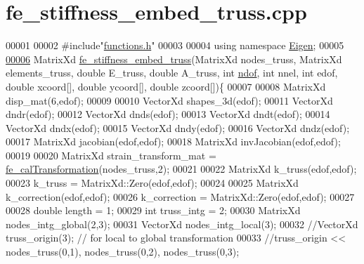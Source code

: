 \hypertarget{fe__stiffness__embed__truss_8cpp_source}{}\section{fe\+\_\+stiffness\+\_\+embed\+\_\+truss.\+cpp}
\label{fe__stiffness__embed__truss_8cpp_source}

\begin{DoxyCode}
00001 
00002 \textcolor{preprocessor}{#include"\hyperlink{functions_8h}{functions.h}"}
00003 
00004 \textcolor{keyword}{using namespace }\hyperlink{namespace_eigen}{Eigen};
00005 
\hyperlink{fe__stiffness__embed__truss_8cpp_ab3798340a27f0972299b3820aab0ccba}{00006} MatrixXd \hyperlink{fe__stiffness__embed__truss_8cpp_ab3798340a27f0972299b3820aab0ccba}{fe\_stiffness\_embed\_truss}(MatrixXd nodes\_truss, MatrixXd elements\_truss, \textcolor{keywordtype}{
      double} E\_truss, \textcolor{keywordtype}{double} A\_truss, \textcolor{keywordtype}{int} \hyperlink{_global_variables_8h_aa789fe4d8a13fd0990b630909430d5d0}{ndof}, \textcolor{keywordtype}{int} nnel, \textcolor{keywordtype}{int} edof, \textcolor{keywordtype}{double} xcoord[], \textcolor{keywordtype}{double} ycoord[], \textcolor{keywordtype}{double} 
      zcoord[])\{
00007 
00008     MatrixXd disp\_mat(6,edof);
00009 
00010     VectorXd shapes\_3d(edof);
00011     VectorXd dndr(edof);    
00012     VectorXd dnds(edof);
00013     VectorXd dndt(edof);
00014     VectorXd dndx(edof);    
00015     VectorXd dndy(edof);
00016     VectorXd dndz(edof);
00017     MatrixXd jacobian(edof,edof);
00018     MatrixXd invJacobian(edof,edof);
00019 
00020     MatrixXd strain\_transform\_mat = \hyperlink{functions_8h_aa41c40dffea4251a07a8a3f5062f47ae}{fe\_calTransformation}(nodes\_truss,2);
00021 
00022     MatrixXd k\_truss(edof,edof);
00023     k\_truss = MatrixXd::Zero(edof,edof);
00024 
00025     MatrixXd k\_correction(edof,edof);
00026     k\_correction = MatrixXd::Zero(edof,edof);
00027     
00028     \textcolor{keywordtype}{double} length = 1;
00029     \textcolor{keywordtype}{int} truss\_intg = 2;
00030     MatrixXd nodes\_intg\_global(2,3);
00031     VectorXd nodes\_intg\_local(3);
00032     \textcolor{comment}{//VectorXd truss\_origin(3); // for local to global transformation}
00033     \textcolor{comment}{//truss\_origin << nodes\_truss(0,1), nodes\_truss(0,2), nodes\_truss(0,3);}

\end{DoxyCode}
